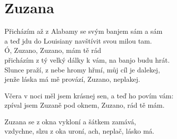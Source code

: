\section{Zuzana}

\onehalfspacing

Přicházím až z Alabamy se svým banjem sám a sám \\
a teď jdu do Louisiany navštívit svou milou tam.\\

{}Ó, Zuzano, Zuzano, mám tě rád \\
přicházím z tý velký dálky k vám, na banjo budu hrát. \\

\sloka
Slunce praží, z nebe hromy hřmí, můj cíl je dalekej, \\
jenže láska má mě provází, Zuzano, neplakej. \\


\sloka
Včera v noci měl jsem krásnej sen, a teď ho povím vám: \\
zpíval jsem Zuzaně pod oknem, Zuzano, rád tě mám. \\


\sloka
Zuzana se z okna vykloní a šátkem zamává, \\
vzdychne, slzu z oka uroní, ach, neplač, lásko má. \\

